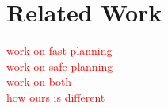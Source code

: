 \section{Related Work \label{sec:relatedwork}}
\textcolor{red}{work on fast planning\\
work on safe planning\\
work on both\\
how ours is different}